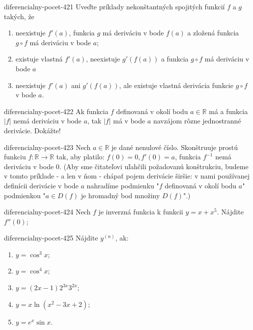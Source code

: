 \begin{defproblem}{diferencialny-pocet-421}
Uveďte príklady nekonštantných spojitých funkcií $f$ a $g$ takých, že
\begin{enumerate}
\item neexistuje $f'(a)$, funkcia $g$ má deriváciu v bode $f(a)$ a zložená funkcia $g\circ f$ má deriváciu v bode $a$;
\item existuje vlastná $f'(a)$, neexistuje $g'(f(a))$ a funkcia $g\circ f$ má deriváciu v bode $a$
\item neexistuje $f'(a)$ ani $g'(f(a))$, ale existuje vlastná derivácia funkcie $g\circ f$ v bode $a$.
\end{enumerate}
\end{defproblem}

\begin{defproblem}{diferencialny-pocet-422}
Ak funkcia $f$ definovaná v okolí bodu $a\in\mathbb{R}$ má a funkcia $|f|$ nemá deriváciu v bode $a$, tak $|f|$ má v bode $a$ navzájom rôzne jednostranné derivácie. Dokážte!
\end{defproblem}

\begin{defproblem}{diferencialny-pocet-423}
Nech $a\in\mathbb{R}$ je dané nenulové číslo. Skonštruuje prostú funkciu $f:\mathbb{R}\rightarrow\mathbb{R}$ tak, aby platilo: $f(0)=0,f'(0)=a$, funkcia $f^{-1}$ nemá deriváciu v bode $0$. (Aby sme čitateľovi uľahčili požadovanú konštrukciu, budeme v tomto príklade - a len v ňom - chápať pojem derivácie širšie: v nami používanej definícii derivácie v bode $a$ nahradíme podmienku "$f$ definovaná v okolí bodu $a$" podmienkou "$a\in D(f)$ je hromadný bod množiny $D(f)$".)
\end{defproblem}

\begin{defproblem}{diferencialny-pocet-424}
Nech $f$ je inverzná funkcia k funkcii $y=x+x^5$. Nájdite $f''(0)$;
\end{defproblem}

\begin{defproblem}{diferencialny-pocet-425}
Nájdite $y^{(n)}$, ak:
\begin{multicols}{2}
\begin{enumerate}
    \item $y=\cos^3 x$;
	\item $y=\cos^4 x$;
	\item $y=(2x-1)2^{3x}3^{2x}$;
	\item $y=x\ln (x^2-3x+2)$;
	\item $y=e^x \sin x$.
\end{enumerate}
\end{multicols}
\end{defproblem}

